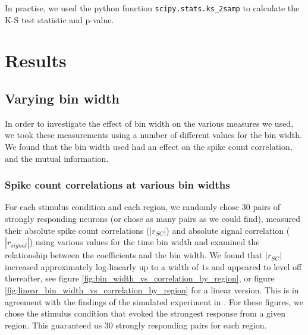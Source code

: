 \documentclass[a4paper,12pt]{article}
\theoremstyle{definition}
\begin{document}
In practise, we used the python function \texttt{scipy.stats.ks\_2samp} to calculate the K-S test statistic and p-value.

\section{Results}
\subsection{Varying bin width}
In order to investigate the effect of bin width on the various measures we used, we took these measurements using a number of different values for the bin width. We found that the bin width used had an effect on the spike count correlation, and the mutual information.

\subsubsection{Spike count correlations at various bin widths}\label{sec:corr_vs_bin_widths}
For each stimulus condition and each region, we randomly chose $30$ pairs of strongly responding neurons (or chose as many pairs as we could find), measured their absolute spike count correlations ($|r_{SC}|$) and absolute signal correlation ($|r_{signal}|$) using various values for the time bin width and examined the relationship between the coefficients and the bin width. We found that $|r_{SC}|$ increased approximately log-linearly up to a width of $1$s and appeared to level off thereafter, see figure \ref{fig:bin_width_vs_correlation_by_region}, or figure \ref{fig:linear_bin_width_vs_correlation_by_region} for a linear version. This is in agreement with the findings of the simulated experiment in \cite{cohen}. For these figures, we chose the stimulus condition that evoked the strongest response from a given region. This guaranteed us $30$ strongly responding pairs for each region.
\end{document}
